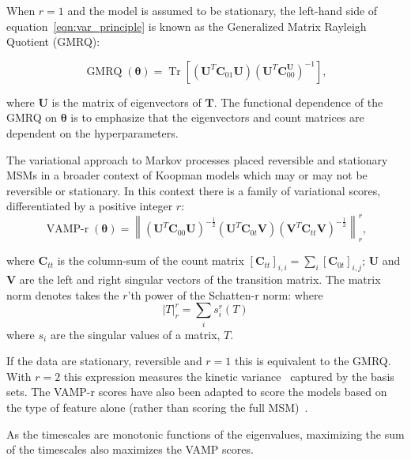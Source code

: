 \documentclass[journal=jacsat,manuscript=article]{achemso}
\begin{document}
When $r=1$ and the model is assumed to be stationary\cite{mcgibbonVariationalCrossvalidationSlow2015}, the left-hand side of equation~\ref{eqn:var_principle} is known as the Generalized Matrix Rayleigh Quotient (GMRQ):

\begin{equation}
    \operatorname{GMRQ}(\bm{\theta}) = \operatorname{Tr}\left[(\mathbf{U}^{T}\mathbf{C}_{01}\mathbf{U})(\mathbf{U}^{T}\mathbf{C}_{00}^\mathbf{U})^{-1}\right], \label{eqn:gmrq_def}
\end{equation}

where $\mathbf{U}$ is the matrix of eigenvectors of $\mathbf{T}$. The functional dependence of the GMRQ on $\bm{\theta}$ is to emphasize that the eigenvectors and count matrices are dependent on the hyperparameters. 

The variational approach to Markov processes placed reversible and stationary MSMs in a broader context of Koopman models which may or may not be reversible or stationary.  In this context there is a family of variational scores, differentiated by a positive integer $r$: 
\begin{equation}
     \operatorname{VAMP-r}(\bm{\theta}) = \left \| (\mathbf{U}^{T}\mathbf{C}_{00}\mathbf{U})^{-\frac{1}{2}}(\mathbf{U}^{T}\mathbf{C}_{0t}\mathbf{V})(\mathbf{V}^{T}\mathbf{C}_{tt}\mathbf{V})^{-\frac{1}{2}} \right \|_{r}^{r}, \label{eqn:vamp_def}
\end{equation}

where $\mathbf{C}_{tt}$ is the column-sum of the count matrix $[\mathbf{C}_{tt}]_{i, i} = \sum_i [\mathbf{C}_{0t}]_{i, j}$; $\mathbf{U}$ and $\mathbf{V}$ are the left and right singular vectors of the transition matrix. The matrix norm denotes takes the $r$'th power of the Schatten-r norm: 
where
\begin{equation}
    \left | T \right |_{r}^{r} = \sum_{i}s_i^r(T)
\end{equation}
where $s_i$ are the singular values of a matrix, $T$.  

If the data are stationary, reversible and $r=1$ this is equivalent to the GMRQ. With $r=2$ this expression measures the kinetic variance~\cite{noeKineticDistanceKinetic2015} captured by the basis sets. The VAMP-r scores have also been adapted to score the models based on the type of feature alone (rather than scoring the full MSM)~\cite{scherer_variational_2019}. 

As the timescales are monotonic functions of the eigenvalues, maximizing the sum of the timescales also maximizes the VAMP scores. 
\end{document}

